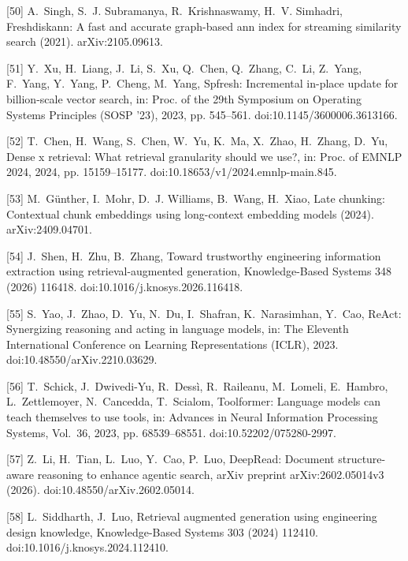 \documentclass[11pt]{article}
\begin{document}
[50] 
A.~Singh, S.~J. Subramanya, R.~Krishnaswamy, H.~V. Simhadri, Freshdiskann: A
  fast and accurate graph-based ann index for streaming similarity search
  (2021).
  arXiv:2105.09613.



[51] 
Y.~Xu, H.~Liang, J.~Li, S.~Xu, Q.~Chen, Q.~Zhang, C.~Li, Z.~Yang, F.~Yang,
  Y.~Yang, P.~Cheng, M.~Yang, Spfresh: Incremental in-place update for
  billion-scale vector search, in: Proc. of the 29th Symposium on Operating
  Systems Principles (SOSP '23), 2023, pp. 545--561.
  doi:10.1145/3600006.3613166.



[52] 
T.~Chen, H.~Wang, S.~Chen, W.~Yu, K.~Ma, X.~Zhao, H.~Zhang, D.~Yu, Dense x
  retrieval: What retrieval granularity should we use?, in: Proc. of EMNLP
  2024, 2024, pp. 15159--15177.
  doi:10.18653/v1/2024.emnlp-main.845.



[53] 
M.~G{\"u}nther, I.~Mohr, D.~J. Williams, B.~Wang, H.~Xiao, Late chunking:
  Contextual chunk embeddings using long-context embedding models (2024).
  arXiv:2409.04701.



[54] 
J.~Shen, H.~Zhu, B.~Zhang, Toward trustworthy engineering information
  extraction using retrieval-augmented generation, Knowledge-Based Systems 348
  (2026) 116418.
  doi:10.1016/j.knosys.2026.116418.



[55] 
S.~Yao, J.~Zhao, D.~Yu, N.~Du, I.~Shafran, K.~Narasimhan, Y.~Cao, {ReAct}:
  Synergizing reasoning and acting in language models, in: The Eleventh
  International Conference on Learning Representations ({ICLR}), 2023.
  doi:10.48550/arXiv.2210.03629.



[56] 
T.~Schick, J.~Dwivedi-Yu, R.~Dess{\`i}, R.~Raileanu, M.~Lomeli, E.~Hambro,
  L.~Zettlemoyer, N.~Cancedda, T.~Scialom, Toolformer: Language models can
  teach themselves to use tools, in: Advances in Neural Information Processing
  Systems, Vol.~36, 2023, pp. 68539--68551.
  doi:10.52202/075280-2997.



[57] 
Z.~Li, H.~Tian, L.~Luo, Y.~Cao, P.~Luo, {DeepRead}: Document structure-aware
  reasoning to enhance agentic search, arXiv preprint arXiv:2602.05014v3
  (2026).
  doi:10.48550/arXiv.2602.05014.



[58] 
L.~Siddharth, J.~Luo, {Retrieval augmented generation using engineering design
  knowledge}, Knowledge-Based Systems 303 (2024) 112410.
  doi:10.1016/j.knosys.2024.112410.
\end{document}
